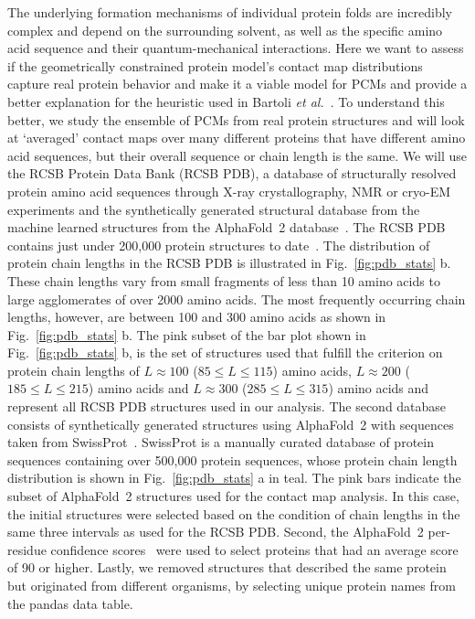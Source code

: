 \documentclass[
reprint,
twocolumn,
amsmath,amssymb,superscriptaddress,aps,
pre]{revtex4-1}
\begin{document}
The underlying formation mechanisms of individual protein folds are incredibly complex and depend on the surrounding solvent, as well as the specific amino acid sequence and their quantum-mechanical interactions. Here we want to assess if the geometrically constrained protein model's contact map distributions capture real protein behavior and make it a viable model for PCMs and provide a better explanation for the heuristic used in Bartoli \textit{et al.}~\cite{bartoli2008effecta}. To understand this better, we study the ensemble of PCMs from real protein structures and will look at `averaged' contact maps over many different proteins that have different amino acid sequences, but their overall sequence or chain length is the same. 
We will use the RCSB Protein Data Bank (RCSB PDB), a database of structurally resolved protein amino acid sequences through X-ray crystallography, NMR or cryo-EM experiments and the synthetically generated structural database from the machine learned structures from the AlphaFold~2 database~\cite{varadi2022alphafold}. The RCSB PDB contains just under 200,000 protein structures to date~\cite{berman2000protein}. The distribution of protein chain lengths in the RCSB PDB is illustrated in Fig.~\ref{fig:pdb_stats} b. These chain lengths vary from small fragments of less than 10 amino acids to large agglomerates of over 2000 amino acids. The most frequently occurring chain lengths, however, are between 100 and 300 amino acids as shown in Fig.~\ref{fig:pdb_stats} b. The pink subset of the bar plot shown in Fig.~\ref{fig:pdb_stats} b, is the set of structures used that fulfill the criterion on protein chain lengths of $L\approx100$ ($85\le L\le 115$) amino acids, $L\approx 200$ ($185 \le L \le 215$) amino acids and $L\approx300$ ($285 \le L\le 315$) amino acids and represent all RCSB PDB structures used in our analysis. The second database consists of synthetically generated structures using AlphaFold~2 with sequences taken from SwissProt~\cite{bairoch2000swissprot}. SwissProt is a manually curated database of protein sequences containing over 500,000 protein sequences, whose protein chain length distribution is shown in Fig.~\ref{fig:pdb_stats} a in teal. The pink bars indicate the subset of AlphaFold~2 structures used for the contact map analysis. In this case, the initial structures were selected based on the condition of chain lengths in the same three intervals as used for the RCSB PDB. Second, the AlphaFold~2 per-residue confidence scores~\cite{jumper2021highly} were used to select proteins that had an average score of 90 or higher. Lastly, we removed structures that described the same protein but originated from different organisms, by selecting unique protein names from the pandas data table. 
\end{document}
